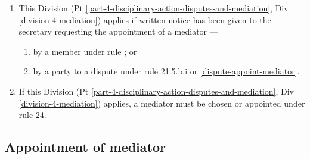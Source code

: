\documentclass[../constitution.tex]{subfiles}
\begin{document}
\begin{enumerate}

\item This Division (Pt \ref{part-4-disciplinary-action-disputes-and-mediation}, Div \ref{division-4-mediation}) applies if written notice has been given to the secretary requesting the appointment of a mediator ---

  \begin{enumerate}
  
  \item by a member under rule ; or
  \item by a party to a dispute under rule 21.5.b.i or \ref{dispute-appoint-mediator}.
  \end{enumerate}
\item If this Division (Pt \ref{part-4-disciplinary-action-disputes-and-mediation}, Div \ref{division-4-mediation}) applies, a mediator must be chosen or appointed under rule 24.
\end{enumerate}

\hypertarget{appointment-of-mediator-1}{%
\subsection{Appointment of mediator}\label{appointment-of-mediator}}
\end{document}
